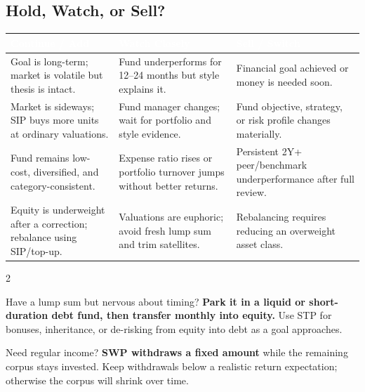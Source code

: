 \documentclass[11pt,a4paper]{article}
\begin{document}
\subsection{Hold, Watch, or Sell?}

\begingroup
\renewcommand{\arraystretch}{1.20}
\setlength{\tabcolsep}{5pt}
\begin{tabularx}{\linewidth}{|>{\raggedright\arraybackslash\small\sffamily}X|>{\raggedright\arraybackslash\small\sffamily}X|>{\raggedright\arraybackslash\small\sffamily}X|}
\hline
\rowcolor{positive!75}
\textcolor{white}{\textbf{Continue / Add}} & \textcolor{white}{\textbf{Watch Closely}} & \textcolor{white}{\textbf{Sell / Switch}} \\
\hline
Goal is long-term; market is volatile but thesis is intact. & Fund underperforms for 12--24 months but style explains it. & Financial goal achieved or money is needed soon. \\
\hline
\rowcolor{lightbg}
Market is sideways; SIP buys more units at ordinary valuations. & Fund manager changes; wait for portfolio and style evidence. & Fund objective, strategy, or risk profile changes materially. \\
\hline
Fund remains low-cost, diversified, and category-consistent. & Expense ratio rises or portfolio turnover jumps without better returns. & Persistent 2Y+ peer/benchmark underperformance after full review. \\
\hline
\rowcolor{lightbg}
Equity is underweight after a correction; rebalance using SIP/top-up. & Valuations are euphoric; avoid fresh lump sum and trim satellites. & Rebalancing requires reducing an overweight asset class. \\
\hline
\end{tabularx}
\endgroup

\vspace{5pt}
\begin{multicols}{2}
\begin{infobox}[title=STP --- Systematic Transfer Plan]
Have a lump sum but nervous about timing?  \textbf{Park it in a liquid or short-duration debt fund, then transfer monthly into equity.}  Use STP for bonuses, inheritance, or de-risking from equity into debt as a goal approaches.
\end{infobox}

\begin{infobox}[title=SWP --- Systematic Withdrawal Plan]
Need regular income?  \textbf{SWP withdraws a fixed amount} while the remaining corpus stays invested.  Keep withdrawals below a realistic return expectation; otherwise the corpus will shrink over time.
\end{infobox}
\end{multicols}
\end{document}

